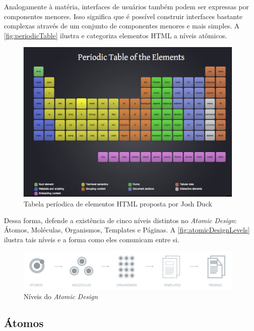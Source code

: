 Analogamente à matéria, interfaces de usuários também podem ser expressas por componentes menores. Isso significa que é possível construir interfaces bastante complexas através de um conjunto de componentes menores e mais simples. A \autoref{fig:periodicTable} ilustra e categoriza elementos HTML a níveis atômicos.

\begin{figure}
	\includegraphics[width=\linewidth]{./04-figuras/02_referencial_teorico/periodic-table.png}
	\caption{Tabela períodica de elementos HTML proposta por Josh Duck}
  \label{fig:periodicTable}
\end{figure}

Dessa forma, \cite{frostAtomicDesign} defende a existência de cinco níveis distintos no \textit{Atomic Design}: Átomos, Moléculas, Organismos, Templates e Páginas. A \autoref{fig:atomicDesignLevels} ilustra tais níveis e a forma como eles comunicam entre si.

\begin{figure}
	\includegraphics[width=\linewidth]{./04-figuras/02_referencial_teorico/atomic-levels.png}
	\caption{Níveis do \textit{Atomic Design}}
  \label{fig:atomicDesignLevels}
\end{figure}

\subsection{Átomos}
\label{subsec:atomos}

